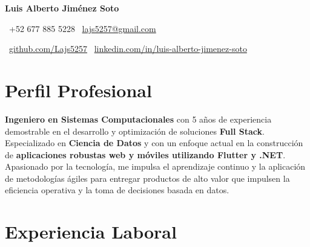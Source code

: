 \documentclass[11pt]{article}
\begin{document}
\begin{center}
{\huge \textbf{Luis Alberto Jiménez Soto}}
\end{center}

\begin{center}
\raisebox{-0.1ex}{\faPhone}\ +52 677 885 5228 \quad
\raisebox{-0.1ex}{\faEnvelope}\ \href{mailto:lajs5257@gmail.com}{lajs5257@gmail.com}
\end{center}
\begin{center}
\raisebox{-0.1ex}{\faGithub}\ \href{https://github.com/Lajs5257}{github.com/Lajs5257} \quad
\raisebox{-0.1ex}{\faLinkedin}\ \href{https://www.linkedin.com/in/luis-alberto-jimenez-soto/}{linkedin.com/in/luis-alberto-jimenez-soto}
\end{center}

\section{Perfil Profesional}
\textbf{Ingeniero en Sistemas Computacionales} con 5 años de experiencia demostrable en el desarrollo y optimización de soluciones \textbf{Full Stack}. Especializado en \textbf{Ciencia de Datos} y con un enfoque actual en la construcción de \textbf{aplicaciones robustas web y móviles utilizando Flutter y .NET}. Apasionado por la tecnología, me impulsa el aprendizaje continuo y la aplicación de metodologías ágiles para entregar productos de alto valor que impulsen la eficiencia operativa y la toma de decisiones basada en datos.

\section{Experiencia Laboral}
\end{document}
